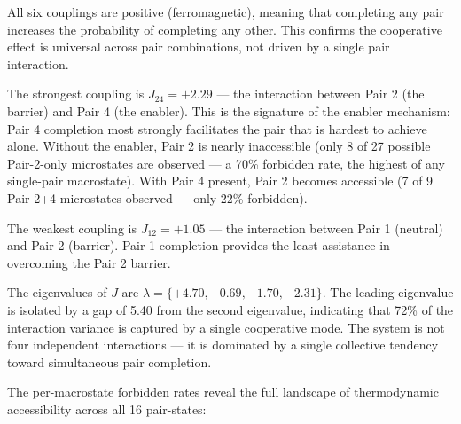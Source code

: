 \documentclass[
  11pt,
]{article}
\begin{document}
All six couplings are positive (ferromagnetic), meaning that completing
any pair increases the probability of completing any other. This
confirms the cooperative effect is universal across pair combinations,
not driven by a single pair interaction.

The strongest coupling is \(J_{24} = +2.29\) --- the interaction between
Pair 2 (the barrier) and Pair 4 (the enabler). This is the signature of
the enabler mechanism: Pair 4 completion most strongly facilitates the
pair that is hardest to achieve alone. Without the enabler, Pair 2 is
nearly inaccessible (only 8 of 27 possible Pair-2-only microstates are
observed --- a 70\% forbidden rate, the highest of any single-pair
macrostate). With Pair 4 present, Pair 2 becomes accessible (7 of 9
Pair-2+4 microstates observed --- only 22\% forbidden).

The weakest coupling is \(J_{12} = +1.05\) --- the interaction between
Pair 1 (neutral) and Pair 2 (barrier). Pair 1 completion provides the
least assistance in overcoming the Pair 2 barrier.

The eigenvalues of \(J\) are
\(\lambda = \{+4.70, -0.69, -1.70, -2.31\}\). The leading eigenvalue is
isolated by a gap of 5.40 from the second eigenvalue, indicating that
72\% of the interaction variance is captured by a single cooperative
mode. The system is not four independent interactions --- it is
dominated by a single collective tendency toward simultaneous pair
completion.

The per-macrostate forbidden rates reveal the full landscape of
thermodynamic accessibility across all 16 pair-states:
\end{document}

